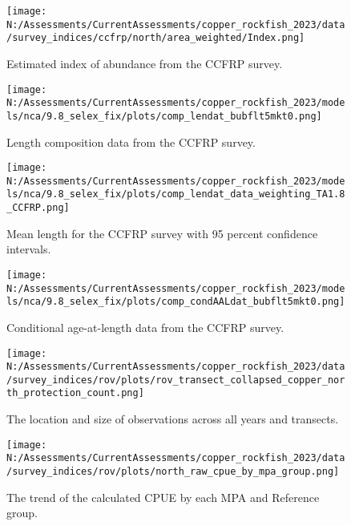 \documentclass[11pt,
  english,
  letterpaper,
]{article}
\begin{document}
\pagebreak

\begin{figure}
\centering
\texttt{[image: N:/Assessments/CurrentAssessments/copper\_rockfish\_2023/data/survey\_indices/ccfrp/north/area\_weighted/Index.png]}
\caption{Estimated index of abundance from the CCFRP survey.\label{fig:ccfrp-index-main}}
\end{figure}

\pagebreak

\begin{figure}
\centering
\texttt{[image: N:/Assessments/CurrentAssessments/copper\_rockfish\_2023/models/nca/9.8\_selex\_fix/plots/comp\_lendat\_bubflt5mkt0.png]}
\caption{Length composition data from the CCFRP survey.\label{fig:ccfrp-len-data}}
\end{figure}

\pagebreak

\begin{figure}
\centering
\texttt{[image: N:/Assessments/CurrentAssessments/copper\_rockfish\_2023/models/nca/9.8\_selex\_fix/plots/comp\_lendat\_data\_weighting\_TA1.8\_CCFRP.png]}
\caption{Mean length for the CCFRP survey with 95 percent confidence intervals.\label{fig:ccfrp-mean-len-data}}
\end{figure}

\pagebreak

\begin{figure}
\centering
\texttt{[image: N:/Assessments/CurrentAssessments/copper\_rockfish\_2023/models/nca/9.8\_selex\_fix/plots/comp\_condAALdat\_bubflt5mkt0.png]}
\caption{Conditional age-at-length data from the CCFRP survey.\label{fig:ccfrp-age-data}}
\end{figure}

\pagebreak

\begin{figure}
\centering
\texttt{[image: N:/Assessments/CurrentAssessments/copper\_rockfish\_2023/data/survey\_indices/rov/plots/rov\_transect\_collapsed\_copper\_north\_protection\_count.png]}
\caption{The location and size of observations across all years and transects.\label{fig:rov-obs-loc}}
\end{figure}

\pagebreak

\begin{figure}
\centering
\texttt{[image: N:/Assessments/CurrentAssessments/copper\_rockfish\_2023/data/survey\_indices/rov/plots/north\_raw\_cpue\_by\_mpa\_group.png]}
\caption{The trend of the calculated CPUE by each MPA and Reference group.\label{fig:rov-raw-cpue}}
\end{figure}
\end{document}
